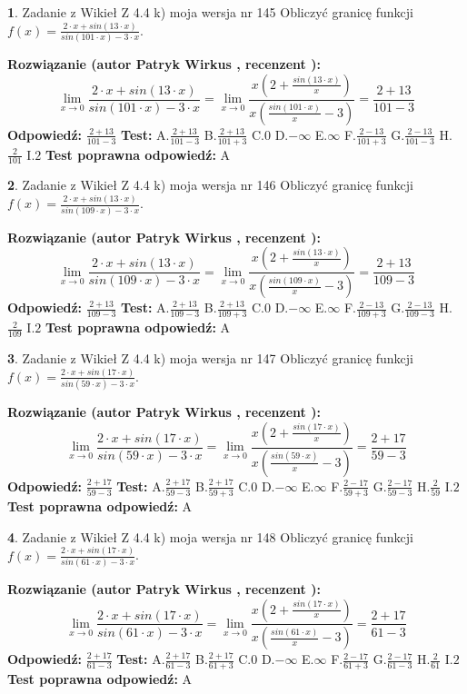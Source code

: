\documentclass[12pt, a4paper]{article}
\theoremstyle{definition} %
\newtheorem{zad}{}
\newcommand{\zadStart}[1]{\begin{zad}#1\newline}
\newcommand{\zadStop}{\end{zad}}
\newcommand{\rozwStart}[2]{\noindent \textbf{Rozwiązanie (autor #1 , recenzent #2): }\newline}
\newcommand{\rozwStop}{\newline}
\newcommand{\odpStart}{\noindent \textbf{Odpowiedź:}\newline}
\newcommand{\odpStop}{\newline}
\newcommand{\testStart}{\noindent \textbf{Test:}\newline}
\newcommand{\testStop}{\newline}
\newcommand{\kluczStart}{\noindent \textbf{Test poprawna odpowiedź:}\newline}
\newcommand{\kluczStop}{\newline}
\begin{document}
\zadStart{Zadanie z Wikieł Z 4.4 k) moja wersja nr 145}
Obliczyć granicę funkcji $f(x)=\frac{2\cdot x +sin(13\cdot x)}{sin(101\cdot x) -3\cdot x}$.
\zadStop
\rozwStart{Patryk Wirkus}{}
$$\lim\limits_{x\to 0}\frac{2\cdot x +sin(13\cdot x)}{sin(101\cdot x) -3\cdot x}
=\lim\limits_{x\to 0}\frac{x(2+\frac{sin(13\cdot x)}{x})}{x(\frac{sin(101\cdot x)}{x}-3)}
=\frac{2+13}{101-3}$$
\rozwStop
\odpStart
$\frac{2+13}{101-3}$
\odpStop
\testStart
A.$\frac{2+13}{101-3}$
B.$\frac{2+13}{101+3}$
C.$0$
D.$-\infty$
E.$\infty$
F.$\frac{2-13}{101+3}$
G.$\frac{2-13}{101-3}$
H.$\frac{2}{101}$
I.$2$
\testStop
\kluczStart
A
\kluczStop



\zadStart{Zadanie z Wikieł Z 4.4 k) moja wersja nr 146}
Obliczyć granicę funkcji $f(x)=\frac{2\cdot x +sin(13\cdot x)}{sin(109\cdot x) -3\cdot x}$.
\zadStop
\rozwStart{Patryk Wirkus}{}
$$\lim\limits_{x\to 0}\frac{2\cdot x +sin(13\cdot x)}{sin(109\cdot x) -3\cdot x}
=\lim\limits_{x\to 0}\frac{x(2+\frac{sin(13\cdot x)}{x})}{x(\frac{sin(109\cdot x)}{x}-3)}
=\frac{2+13}{109-3}$$
\rozwStop
\odpStart
$\frac{2+13}{109-3}$
\odpStop
\testStart
A.$\frac{2+13}{109-3}$
B.$\frac{2+13}{109+3}$
C.$0$
D.$-\infty$
E.$\infty$
F.$\frac{2-13}{109+3}$
G.$\frac{2-13}{109-3}$
H.$\frac{2}{109}$
I.$2$
\testStop
\kluczStart
A
\kluczStop



\zadStart{Zadanie z Wikieł Z 4.4 k) moja wersja nr 147}
Obliczyć granicę funkcji $f(x)=\frac{2\cdot x +sin(17\cdot x)}{sin(59\cdot x) -3\cdot x}$.
\zadStop
\rozwStart{Patryk Wirkus}{}
$$\lim\limits_{x\to 0}\frac{2\cdot x +sin(17\cdot x)}{sin(59\cdot x) -3\cdot x}
=\lim\limits_{x\to 0}\frac{x(2+\frac{sin(17\cdot x)}{x})}{x(\frac{sin(59\cdot x)}{x}-3)}
=\frac{2+17}{59-3}$$
\rozwStop
\odpStart
$\frac{2+17}{59-3}$
\odpStop
\testStart
A.$\frac{2+17}{59-3}$
B.$\frac{2+17}{59+3}$
C.$0$
D.$-\infty$
E.$\infty$
F.$\frac{2-17}{59+3}$
G.$\frac{2-17}{59-3}$
H.$\frac{2}{59}$
I.$2$
\testStop
\kluczStart
A
\kluczStop



\zadStart{Zadanie z Wikieł Z 4.4 k) moja wersja nr 148}
Obliczyć granicę funkcji $f(x)=\frac{2\cdot x +sin(17\cdot x)}{sin(61\cdot x) -3\cdot x}$.
\zadStop
\rozwStart{Patryk Wirkus}{}
$$\lim\limits_{x\to 0}\frac{2\cdot x +sin(17\cdot x)}{sin(61\cdot x) -3\cdot x}
=\lim\limits_{x\to 0}\frac{x(2+\frac{sin(17\cdot x)}{x})}{x(\frac{sin(61\cdot x)}{x}-3)}
=\frac{2+17}{61-3}$$
\rozwStop
\odpStart
$\frac{2+17}{61-3}$
\odpStop
\testStart
A.$\frac{2+17}{61-3}$
B.$\frac{2+17}{61+3}$
C.$0$
D.$-\infty$
E.$\infty$
F.$\frac{2-17}{61+3}$
G.$\frac{2-17}{61-3}$
H.$\frac{2}{61}$
I.$2$
\testStop
\kluczStart
A
\kluczStop
\end{document}
